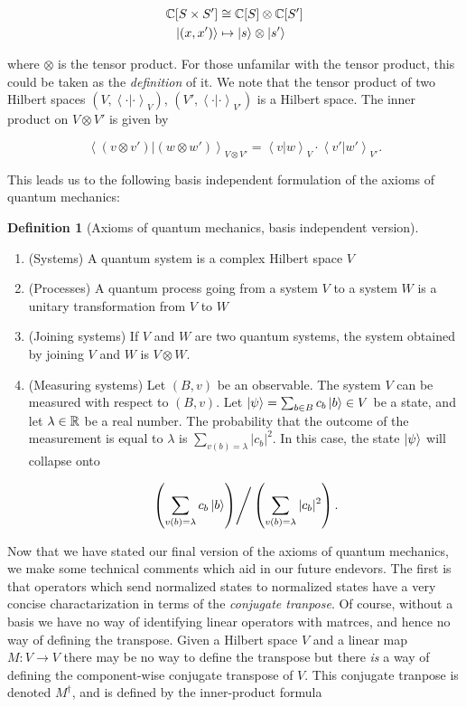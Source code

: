 \documentclass{article}
\theoremstyle{definition}
\newtheorem*{definition}{Definition}
\numberwithin{figure}{section}
\begin{document}
\begin{align*}
\mathbb{C}[S\times S']&\cong \mathbb{C}[S]\otimes \mathbb{C}[S']\\
\ket{(x,x')}&\mapsto \ket{s}\otimes \ket{s'}
\end{align*}

where $\otimes$ is the tensor product. For those unfamilar with the tensor product, this could be taken as the \textit{definition} of it. We note that the tensor product of two Hilbert spaces $(V,\left<\cdot|\cdot\right>_V)$, $(V',\left<\cdot|\cdot\right>_{V'})$ is a Hilbert space. The inner product on $V\otimes V'$ is given by

$$\left<(v\otimes v')| (w\otimes w')\right>_{V\otimes V'}=\left<v | w\right>_V\cdot \left<v' | w'\right>_{V'}.$$

This leads us to the following basis independent formulation of the axioms of quantum mechanics:

\begin{definition}[Axioms of quantum mechanics, basis independent version] $\,$

\begin{enumerate}
\item (Systems) A quantum system is a complex Hilbert space $V$
\item (Processes) A quantum process going from a system $V$ to a system $W$ is a unitary transformation from $V$ to $W$
\item (Joining systems) If $V$ and $W$ are two quantum systems, the system obtained by joining $V$ and $W$ is $V\otimes W$.
\item (Measuring systems) Let $(B,v)$ be an observable. The system $V$ can be measured with respect to $(B,v)$. Let $\ket{\psi}=\sum_{b\in B}c_b \ket{b}\in V$ be a state, and let $\lambda\in \mathbb{R}$ be a real number. The probability that the outcome of the measurement is equal to $\lambda$ is $\sum_{v(b)=\lambda}|c_b|^2$. In this case, the state $\ket{\psi}$ will collapse onto

$$\left.\left(\sum_{v(b)=\lambda}c_b \ket{b}\right)\right/ \left(\sum_{v(b)=\lambda}|c_b|^2\right).$$
\end{enumerate}

\raggedleft\qedsymbol{}
\end{definition}

Now that we have stated our final version of the axioms of quantum mechanics, we make some technical comments which aid in our future endevors. The first is that operators which send normalized states to normalized states have a very concise charactarization in terms of the \textit{conjugate tranpose}. Of course, without a basis we have no way of identifying linear operators with matrces, and hence no way of defining the transpose. Given a Hilbert space $V$ and a linear map $M:V\to V$ there may be no way to define the transpose but there \textit{is} a way of defining the component-wise conjugate transpose of $V$. This conjugate tranpose is denoted $M^\dagger$, and is defined by the inner-product formula
\end{document}
